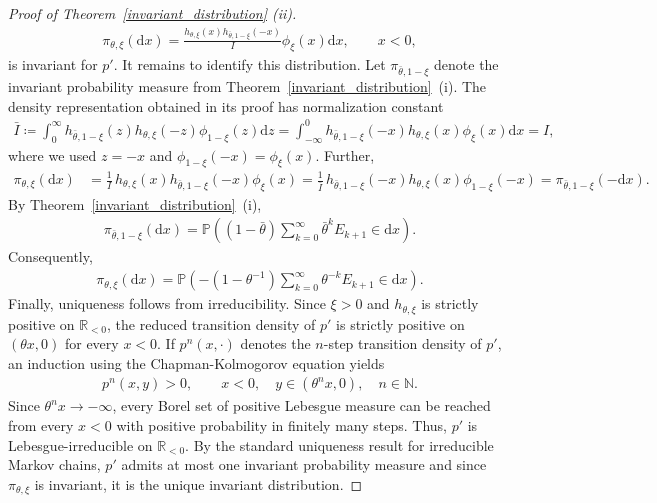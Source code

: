 \documentclass[12pt]{article}
\newcommand{\N}{\mathbb{N}} %
\newcommand{\R}{\mathbb{R}} %
\renewcommand{\P}{\mathbb{P}} %
\newcommand{\1}{\mathds{1}}
\renewcommand{\d}{\mathrm{d}}
\theoremstyle{definition}
\theoremstyle{plain}
\theoremstyle{remark}
\begin{document}
\begin{proof}[Proof of Theorem~\ref{invariant_distribution} (ii)]
\begin{align*} 
    \pi_{\theta,\xi} (\d x) = \frac{ h_{\theta,\xi}(x) h_{\bar\theta,1-\xi}(-x) }{ I  } \phi_\xi( x)\d x, \qquad x<0,
\end{align*} 
is invariant for $p'$. It remains to identify this distribution. Let $\pi_{\bar\theta,1-\xi}$ denote the invariant probability measure from Theorem~\ref{invariant_distribution}~(i). The density representation
obtained in its proof has normalization constant
\begin{align*}
    \bar I
    \coloneqq\int_0^\infty h_{\bar\theta,1-\xi}(z)h_{\theta,\xi}(-z)\phi_{1-\xi}(z)\d z
    =\int_{-\infty}^0h_{\bar\theta,1-\xi}(-x)h_{\theta,\xi}(x)\phi_\xi(x)\d x
    =I,
\end{align*}
where we used $z=-x$ and
$\phi_{1-\xi}(-x)=\phi_\xi(x)$. %
Further,
\begin{align*}
    \pi_{\theta,\xi}(\d x) 
    &=\frac{1}{I}\, h_{\theta,\xi}(x)h_{\bar\theta,1-\xi}(-x)\phi_\xi(x) 
    =\frac{1}{\bar I} \, h_{\bar\theta,1-\xi}(-x)h_{\theta,\xi}(x)\phi_{1-\xi}(-x)
    =\pi_{\bar\theta,1-\xi}(-\d x).
\end{align*}
By Theorem~\ref{invariant_distribution}~(i),
\begin{align*}
    \pi_{\bar\theta,1-\xi}(\d x)
    =
    \P\left(
        (1-\bar\theta)
        \sum_{k=0}^\infty\bar\theta^kE_{k+1}
        \in\d x
    \right).
\end{align*}
Consequently,
\begin{align*}
    \pi_{\theta,\xi}(\d x)
    =
    \P\left(
        -(1-\theta^{-1})
        \sum_{k=0}^\infty\theta^{-k}E_{k+1}
        \in\d x
    \right).
\end{align*}
Finally, uniqueness follows from irreducibility. Since $\xi>0$ and $h_{\theta,\xi}$ is strictly positive on $\R_{<0}$, the reduced transition density of $p'$ is strictly positive on $(\theta x,0)$ for every $x<0$. If $p^n(x,\cdot)$ denotes the $n$-step transition density of $p'$, an induction using the Chapman-Kolmogorov equation yields
\begin{align*}
p^n(x,y)>0,\qquad x<0,\quad y\in(\theta^n x,0),\quad n\in\N.
\end{align*}
Since $\theta^n x\to-\infty$, every Borel set of positive Lebesgue measure can be reached from every $x<0$ with positive probability in finitely many steps. Thus, $p'$ is Lebesgue-irreducible on $\R_{<0}$. By the standard uniqueness result for irreducible Markov chains, $p'$ admits at most one invariant probability measure and since $\pi_{\theta,\xi}$ is invariant, it is the unique invariant distribution.
\end{proof}
\end{document}
